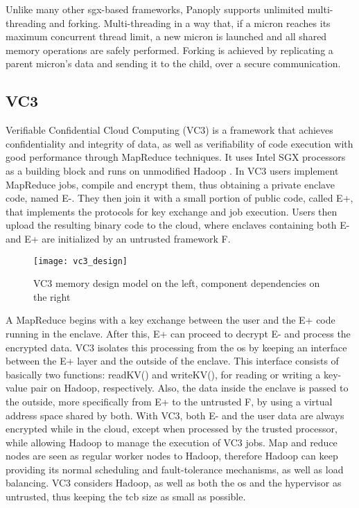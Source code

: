 Unlike many other \gls{sgx}-based frameworks, Panoply supports unlimited multi-threading and forking. Multi-threading in a way that, if a micron reaches its maximum concurrent thread limit, a new micron is launched and all shared memory operations are safely performed. Forking is achieved by replicating a parent micron's data and sending it to the child, over a secure communication. 


\subsection{VC3}
\label{ssec:vc3_mapreduce}

Verifiable Confidential Cloud Computing (VC3) \cite{vc3Paper} is a framework that achieves confidentiality and integrity of data, as well as verifiability of code execution with good performance through MapReduce \cite{mapReduce} techniques. It uses Intel SGX processors as a building block and runs on unmodified Hadoop \cite{hadoop}.
In VC3 users implement MapReduce jobs, compile and encrypt them, thus obtaining a private enclave code, named E-. They then join it with a small portion of public code, called E+, that implements the protocols for key exchange and job execution.
Users then upload the resulting binary code to the cloud, where enclaves containing both E- and E+ are initialized by an untrusted framework F. 

\begin{figure}[htbp]
	\centering
	{\texttt{[image: vc3\_design]}}%
	\caption{VC3 memory design model on the left, component dependencies on the right}
\end{figure}

A MapReduce begins with a key exchange between the user and the E+ code running in the enclave. After this, E+ can proceed to decrypt E- and process the encrypted data. VC3 isolates this processing from the \gls{os} by keeping an interface between the E+ layer and the outside of the enclave. This interface consists of basically two functions: readKV() and writeKV(), for reading or writing a key-value pair on Hadoop, respectively. Also, the data inside the enclave is passed to the outside, more specifically from E+ to the untrusted F, by using a virtual address space shared by both.
With VC3, both E- and the user data are always encrypted while in the cloud, except when processed by the trusted processor, while allowing Hadoop to manage the execution of VC3 jobs. Map and reduce nodes are seen as regular worker nodes to Hadoop, therefore Hadoop can keep providing its normal scheduling and fault-tolerance mechanisms, as well as load balancing. VC3 considers Hadoop, as well as both the \gls{os} and the hypervisor as untrusted, thus keeping the \gls{tcb} size as small as possible.

